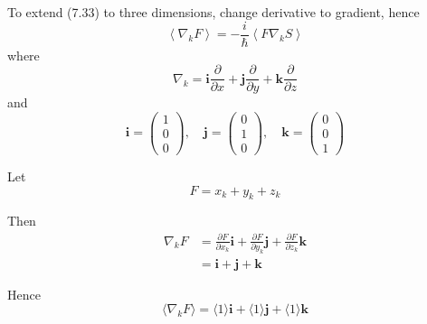


\bigskip
To extend (7.33) to three dimensions, change derivative to gradient, hence
\begin{equation*}
\left\langle\nabla_kF\right\rangle=-\frac{i}{\hbar}\left\langle F\nabla_kS\right\rangle
\tag{1}
\end{equation*}
where
\begin{equation*}
\nabla_k
=\mathbf i\frac{\partial}{\partial x}
+\mathbf j\frac{\partial}{\partial y}
+\mathbf k\frac{\partial}{\partial z}
\end{equation*}
and
\begin{equation*}
\mathbf i=\begin{pmatrix}1\\0\\0\end{pmatrix},
\quad
\mathbf j=\begin{pmatrix}0\\1\\0\end{pmatrix},
\quad
\mathbf k=\begin{pmatrix}0\\0\\1\end{pmatrix}
\end{equation*}

Let
\begin{equation*}
F=x_k+y_k+z_k
\end{equation*}

Then
\begin{align*}
\nabla_kF
&=\frac{\partial F}{\partial x_k}\mathbf i
+\frac{\partial F}{\partial y_k}\mathbf j
+\frac{\partial F}{\partial z_k}\mathbf k
\\
&=\mathbf i+\mathbf j+\mathbf k
\end{align*}

Hence
\begin{equation*}
\langle\nabla_kF\rangle
=\langle1\rangle\mathbf i
+\langle1\rangle\mathbf j
+\langle1\rangle\mathbf k
\tag{2}
\end{equation*}


